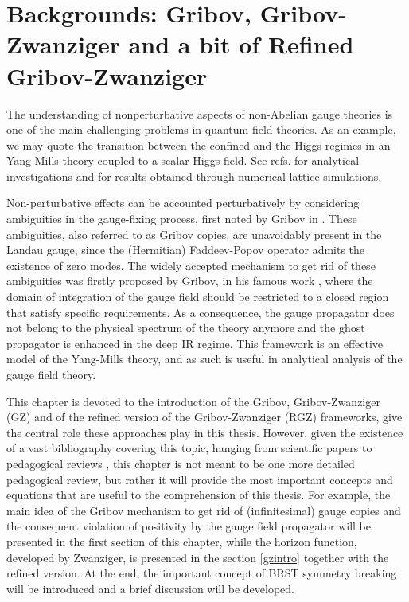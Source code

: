 

\chapter{Backgrounds: Gribov, Gribov-Zwanziger and a bit of Refined Gribov-Zwanziger} 
\label{usefulbkground}


The understanding of nonperturbative aspects of non-Abelian gauge theories is one of the main
challenging problems in quantum field theories. As an example, we may quote the transition
between the confined and the Higgs regimes in an Yang-Mills theory coupled to a scalar Higgs
field. See refs.\cite{Polyakov:1976fu,Cornwall:1998pt,Baulieu:2001vw} for analytical
investigations and
\cite{Fradkin:1978dv,Nadkarni:1989na,Hart:1996ac,Caudy:2007sf,Maas:2011yx,Maas:2010nc,
Greensite:2011zz} for results obtained through numerical lattice simulations.


Non-perturbative effects can be accounted perturbatively by considering ambiguities in the
gauge-fixing process, first noted by Gribov in \cite{Gribov:1977wm}. These ambiguities, also
referred to as Gribov copies, are unavoidably present in the Landau gauge, since the
(Hermitian) Faddeev-Popov operator admits the existence of zero modes. The widely accepted
mechanism to get rid of these ambiguities was firstly proposed by Gribov, in his famous work
\cite{Gribov:1977wm}, where the domain of integration of the gauge field should be restricted
to a closed region that satisfy specific requirements. As a consequence, the gauge propagator
does not belong to the physical spectrum of the theory anymore and the ghost propagator is
enhanced in the deep IR regime. This framework is an effective model of the Yang-Mills theory,
and as such is useful in analytical analysis of the gauge field theory.

This chapter is devoted to the introduction of the Gribov, Gribov-Zwanziger (GZ) and of the
refined version of the Gribov-Zwanziger (RGZ) frameworks, give the central role these
approaches play in this thesis. However, given the existence of a vast bibliography covering
this topic, hanging from scientific papers to pedagogical reviews
\cite{Gribov:1977wm,Sobreiro:2005ec,Vandersickel:2012tz,Dudal:2009bf}, this chapter is not meant to be one
more detailed pedagogical review, but rather it will provide the most important concepts and
equations that are useful to the comprehension of this thesis. For example, the main idea of
the Gribov mechanism to get rid of (infinitesimal) gauge copies and the consequent violation of
positivity by the gauge field propagator will be presented in the first section of this
chapter, while the horizon function, developed by Zwanziger, is presented in the section
\ref{gzintro} together with the refined version. At the end, the important concept of BRST
symmetry breaking will be introduced and a brief discussion will be developed.













